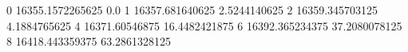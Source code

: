 0 16355.1572265625 0.0
1 16357.681640625 2.5244140625
2 16359.345703125 4.1884765625
4 16371.60546875 16.4482421875
6 16392.365234375 37.2080078125
8 16418.443359375 63.2861328125

